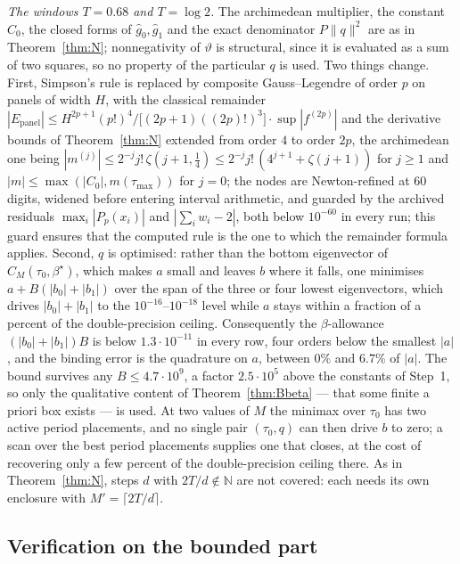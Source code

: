 \documentclass[11pt]{amsart}
\theoremstyle{definition}
\theoremstyle{remark}
\newcommand{\N}{\mathbb N}
\newcommand{\gh}[1]{\widehat g_{#1}}
\begin{document}
\emph{The windows $T=0.68$ and $T=\log2$.} The archimedean multiplier, the constant $C_0$, the closed forms of
$\gh0,\gh1$ and the exact denominator $P\|q\|^2$ are as in Theorem~\ref{thm:N}; nonnegativity of
$\vartheta$ is structural, since it is evaluated as a sum of two squares, so no property of the
particular $q$ is used. Two things change. First, Simpson's rule is replaced by composite
Gauss--Legendre of order $p$ on panels of width $H$, with the classical remainder
$|E_{\mathrm{panel}}|\le H^{2p+1}(p!)^4\big/\big[(2p+1)((2p)!)^3\big]\cdot\sup|f^{(2p)}|$ and the
derivative bounds of Theorem~\ref{thm:N} extended from order $4$ to order $2p$, the archimedean one
being $|m^{(j)}|\le2^{-j}j!\,\zeta(j+1,\frac14)\le2^{-j}j!\,(4^{j+1}+\zeta(j+1))$ for $j\ge1$ and
$|m|\le\max(|C_0|,m(\tau_{\max}))$ for $j=0$; the nodes are Newton-refined at $60$ digits, widened
before entering interval arithmetic, and guarded by the archived residuals
$\max_i|P_p(x_i)|$ and $|\sum_iw_i-2|$, both below $10^{-60}$ in every run; this guard ensures that the
computed rule is the one to which the remainder formula applies. Second, $q$ is optimised: rather than the bottom eigenvector of
$C_M(\tau_0,\beta^\star)$, which makes $a$ small and leaves $b$ where it falls, one minimises
$a+B(|b_0|+|b_1|)$ over the span of the three or four lowest eigenvectors, which drives
$|b_0|+|b_1|$ to the $10^{-16}$--$10^{-18}$ level while $a$ stays within a fraction of a percent of
the double-precision ceiling. Consequently the $\beta$-allowance $(|b_0|+|b_1|)B$ is below
$1.3\cdot10^{-11}$ in every row, four orders below the smallest $|a|$, and the binding error is the
quadrature on $a$, between $0\%$ and $6.7\%$ of $|a|$. The bound survives any $B\le4.7\cdot10^9$,
a factor $2.5\cdot10^5$ above the constants of Step~1, so only the qualitative content of
Theorem~\ref{thm:Bbeta} --- that some finite a priori box exists --- is used. At two values of $M$
the minimax over $\tau_0$ has two active period placements, and no single pair $(\tau_0,q)$ can then
drive $b$ to zero; a scan over the best period placements supplies one that closes, at the cost of
recovering only a few percent of the double-precision ceiling there. As in Theorem~\ref{thm:N},
steps $d$ with $2T/d\notin\N$ are not covered: each needs its own enclosure with
$M'=\lceil2T/d\rceil$.

\subsection{Verification on the bounded part}
\end{document}
